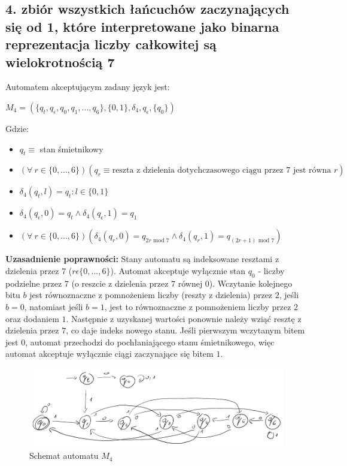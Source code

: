 \documentclass[12pt]{article}
\begin{document}
\newpage

\subsection*{4. zbiór wszystkich łańcuchów zaczynających się od 1, które interpretowane jako binarna
reprezentacja liczby całkowitej są wielokrotnością 7}
    Automatem akceptującym zadany język jest:
    \begin{center}
    \begin{math}
        M_4 = (\{q_t, q_\epsilon, q_0, q_1, ..., q_6\}, \{0, 1\}, \delta_4, q_\epsilon, \{q_0\})
    \end{math}
    \end{center}

    \noindent Gdzie:
    \begin{itemize}
        \item $q_t \equiv$ stan śmietnikowy
        \item $(\forall \: r \in \{0, ..., 6\})(q_r \equiv \text{reszta z dzielenia dotychczasowego ciągu przez } 7 \text{ jest równa } r)$
        \item $\delta_4(q_t, l) = q_t : l \in \{0, 1\}$
        \item $\delta_4(q_\epsilon, 0) = q_t \land \delta_4(q_\epsilon, 1) = q_1$
        \item $(\forall \: r \in \{0, ..., 6\})(\delta_4(q_r, 0) = q_{2r \text{ mod } 7} \land \delta_4(q_r, 1) = q_{(2r + 1) \text{ mod } 7})$
    \end{itemize}

    \noindent \newline \textbf{Uzasadnienie poprawności:} \newline
    Stany automatu są indeksowane resztami z dzielenia przez $7$ ($r \epsilon \{0, ..., 6\}$). Automat akceptuje
    wyłącznie stan $q_0$ - liczby podzielne przez $7$ (o reszcie z dzielenia przez $7$ równej $0$). Wczytanie kolejnego
    bitu $b$ jest równoznaczne z pomnożeniem liczby (reszty z dzielenia) przez $2$, jeśli $b = 0$, natomiast jeśli $b = 1$,
    jest to równoznaczne z pomnożeniem liczby przez $2$ oraz dodaniem $1$. Następnie z uzyskanej wartości ponownie należy wziąć
    resztę z dzielenia przez $7$, co daje indeks nowego stanu. Jeśli pierwszym wczytanym bitem jest $0$, automat przechodzi do
    pochłaniającego stanu śmietnikowego, więc automat akceptuje wyłącznie ciągi zaczynające się bitem $1$.

    \noindent
    \begin{figure}[h]
        \centering
        \includegraphics[width=\linewidth]{img/m4.png}
        \caption{Schemat automatu $M_4$}
        \label{fig:m4}
    \end{figure}
\end{document}
